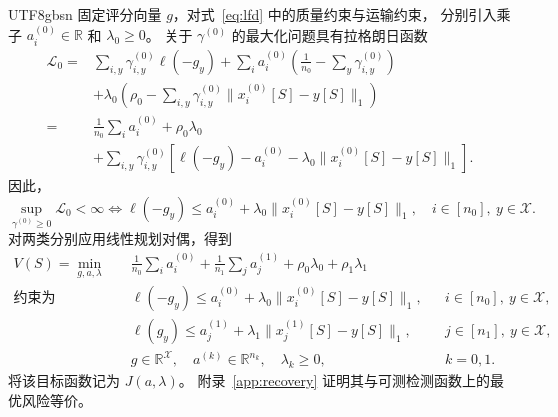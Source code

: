 \documentclass[11pt,a4paper]{article}
\theoremstyle{plain}
\begin{document}
\begin{CJK*}{UTF8}{gbsn}
固定评分向量 $g$，对式~\eqref{eq:lfd} 中的质量约束与运输约束，
分别引入乘子 $a_i^{(0)}\in\mathbb R$ 和 $\lambda_0\ge0$。
关于 $\gamma^{(0)}$ 的最大化问题具有拉格朗日函数
\begin{equation}\label{eq:transport-lagrangian}
\begin{aligned}
\mathcal L_0={}&\sum_{i,y}\gamma_{i,y}^{(0)}\ell(-g_y)
+\sum_i a_i^{(0)}\left(\frac1{n_0}-\sum_y\gamma_{i,y}^{(0)}\right)\\
&+\lambda_0\left(\rho_0-\sum_{i,y}\gamma_{i,y}^{(0)}
\|x_i^{(0)}[S]-y[S]\|_1\right)\\
={}&\frac1{n_0}\sum_i a_i^{(0)}+\rho_0\lambda_0\\
&+\sum_{i,y}\gamma_{i,y}^{(0)}
\left[\ell(-g_y)-a_i^{(0)}
-\lambda_0\|x_i^{(0)}[S]-y[S]\|_1\right].
\end{aligned}
\end{equation}
因此，
\[
\sup_{\gamma^{(0)}\ge0}\mathcal L_0<\infty
\iff
\ell(-g_y)\le a_i^{(0)}+\lambda_0\|x_i^{(0)}[S]-y[S]\|_1,
\quad i\in[n_0],\ y\in\mathcal X.
\]
对两类分别应用线性规划对偶，得到
\begin{equation}\label{eq:finite}
\begin{aligned}
V(S)=\min_{g,a,\lambda}\quad&
\frac1{n_0}\sum_i a_i^{(0)}+\frac1{n_1}\sum_j a_j^{(1)}
+\rho_0\lambda_0+\rho_1\lambda_1\\
\text{约束为}\quad&
\ell(-g_y)\le a_i^{(0)}+\lambda_0\|x_i^{(0)}[S]-y[S]\|_1,
&&i\in[n_0],\ y\in\mathcal X,\\
&\ell(g_y)\le a_j^{(1)}+\lambda_1\|x_j^{(1)}[S]-y[S]\|_1,
&&j\in[n_1],\ y\in\mathcal X,\\
&g\in\mathbb R^{\mathcal X},\quad a^{(k)}\in\mathbb R^{n_k},
\quad\lambda_k\ge0,&&k=0,1.
\end{aligned}
\end{equation}
将该目标函数记为 $J(a,\lambda)$。
附录~\ref{app:recovery} 证明其与可测检测函数上的最优风险等价。


\end{CJK*}
\end{document}
